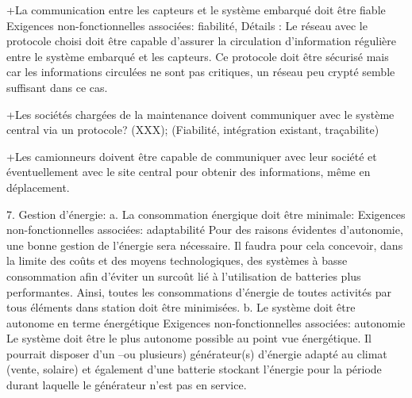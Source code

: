 +La communication entre les capteurs et le système embarqué doit être fiable 
Exigences non-fonctionnelles associées: fiabilité, 
Détails : Le réseau avec le protocole choisi doit être capable d’assurer la circulation d’information régulière entre le système embarqué et les capteurs. Ce protocole doit être sécurisé mais car les informations circulées ne sont pas critiques, un réseau peu crypté semble suffisant dans ce cas.

+Les sociétés chargées de la maintenance doivent communiquer avec le système central via un protocole? (XXX); (Fiabilité, intégration existant, traçabilite)

+Les camionneurs doivent être capable de communiquer avec leur société et éventuellement avec le site central pour obtenir des informations, même en déplacement.


7. Gestion d'énergie:
a. La consommation énergique doit être minimale:
 Exigences non-fonctionnelles associées: adaptabilité 
Pour des raisons évidentes d'autonomie,  une bonne gestion de l'énergie sera nécessaire. Il faudra pour cela concevoir, dans la limite des coûts et des moyens technologiques, des systèmes à basse consommation afin d'éviter un surcoût lié à l'utilisation de batteries plus performantes. Ainsi, toutes les consommations d’énergie de toutes activités par tous éléments dans station doit être minimisées.  
b. Le système doit être autonome en terme énergétique 
Exigences non-fonctionnelles associées: autonomie
Le système doit être le plus autonome possible au point vue énergétique. Il pourrait disposer d’un –ou plusieurs) générateur(s) d’énergie adapté au climat (vente, solaire) et également d’une batterie stockant l'énergie pour la période durant laquelle le générateur n'est pas en service. 

